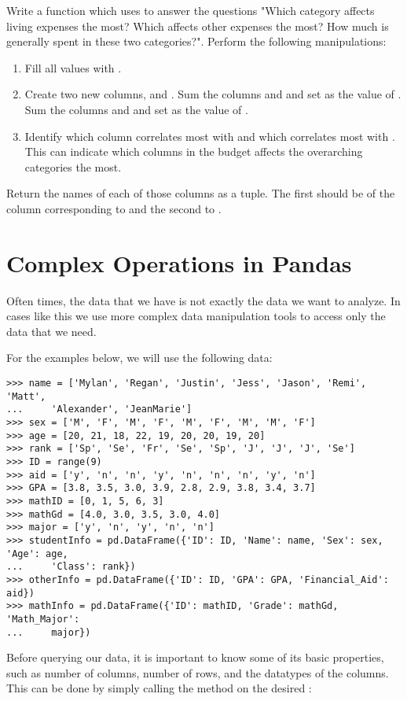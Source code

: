 \begin{problem}
Write a function which uses  to answer the questions "Which category affects living expenses the most? Which affects other expenses the most? How much is generally spent in these two categories?".
Perform the following manipulations:
\begin{enumerate}
\item Fill all  values with .
\item Create two new columns,  and . 
Sum the columns  and  and set as the value of .
Sum the columns  and  and set as the value of .
\item Identify which column correlates most with  and which correlates most with .
This can indicate which columns in the budget affects the overarching categories the most.
\end{enumerate}
Return the names of each of those columns as a tuple.
The first should be of the column corresponding to  and the second to .
\end{problem}

\section*{Complex Operations in Pandas}
Often times, the data that we have is not exactly the data we want to analyze.
In cases like this we use more complex data manipulation tools to access only the data that we need.

For the examples below, we will use the following data:
\begin{lstlisting}
>>> name = ['Mylan', 'Regan', 'Justin', 'Jess', 'Jason', 'Remi', 'Matt',
...		'Alexander', 'JeanMarie']
>>> sex = ['M', 'F', 'M', 'F', 'M', 'F', 'M', 'M', 'F']
>>> age = [20, 21, 18, 22, 19, 20, 20, 19, 20]
>>> rank = ['Sp', 'Se', 'Fr', 'Se', 'Sp', 'J', 'J', 'J', 'Se']
>>> ID = range(9)
>>> aid = ['y', 'n', 'n', 'y', 'n', 'n', 'n', 'y', 'n']
>>> GPA = [3.8, 3.5, 3.0, 3.9, 2.8, 2.9, 3.8, 3.4, 3.7]
>>> mathID = [0, 1, 5, 6, 3]
>>> mathGd = [4.0, 3.0, 3.5, 3.0, 4.0]
>>> major = ['y', 'n', 'y', 'n', 'n']
>>> studentInfo = pd.DataFrame({'ID': ID, 'Name': name, 'Sex': sex, 'Age': age, 
...		'Class': rank})
>>> otherInfo = pd.DataFrame({'ID': ID, 'GPA': GPA, 'Financial_Aid': aid})
>>> mathInfo = pd.DataFrame({'ID': mathID, 'Grade': mathGd, 'Math_Major': 
...		major})
\end{lstlisting}
Before querying our data, it is important to know some of its basic properties,
such as number of columns, number of rows, and the datatypes of the columns.
This can be done by simply calling the  method on the desired
:

